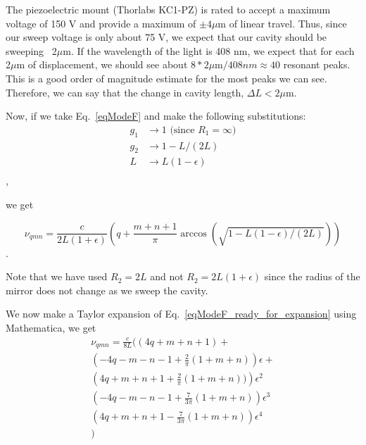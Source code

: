 The piezoelectric mount (Thorlabs KC1-PZ) is rated to accept a maximum voltage of 150 V and provide a maximum of $\pm4\mu$m of linear travel. Thus, since our sweep voltage is only about 75 V, we expect that our cavity should be sweeping ~2$\mu$m. If the wavelength of the light is 408 nm, we expect that for each 2$\mu$m of displacement, we should see about $8*2\mu$m$/408nm \approx 40$ resonant peaks. This is a good order of magnitude estimate for the most peaks we can see. Therefore, we can say that the change in cavity length, $\Delta L< 2\mu$m.

Now, if we take Eq.\ \ref{eqModeF} and make the following substitutions:
\begin{align}
g_1&\rightarrow1 \text{ (since $R_1=\infty$)} \\
g_2&\rightarrow 1-L/(2L)\\
L&\rightarrow L(1-\epsilon)\\
\end{align},

we get 

\begin{equation} \label{eqModeF_ready_for_expansion}
\nu_{qmn}=\frac{c}{2L(1+\epsilon)}\left(q+\frac{m+n+1}{\pi}\arccos(\sqrt{1-L(1-\epsilon)/(2L)})\right)
\end{equation}.

Note that we have used $R_2=2L$ and not $R_2=2L(1+\epsilon)$ since the radius of the mirror does not change as we sweep the cavity. 

We now make a Taylor expansion of Eq.\ \ref{eqModeF_ready_for_expansion} using Mathematica, we get 
\begin{align*}
\nu_{qmn}=\frac{c}{8L}\biggl((4q+m+n+1) +\\
 \left(-4q-m-n-1+\frac{2}{\pi}(1+m+n)\right)\epsilon+\\
 \left(4q+m+n+1+\frac{2}{\pi}(1+m+n))\right)\epsilon^2\\
 \left(-4q-m-n-1+\frac{7}{3\pi}(1+m+n)\right)\epsilon^3\\
 \left(4q+m+n+1-\frac{7}{3\pi}(1+m+n)\right)\epsilon^4\\
\biggr)
\end{align*}

